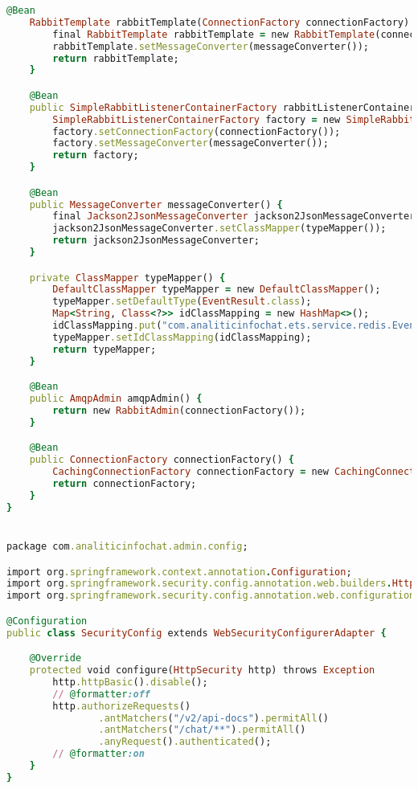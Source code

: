 \begin{lstlisting}[language=Ruby, style=rubystyle]
    @Bean
    RabbitTemplate rabbitTemplate(ConnectionFactory connectionFactory) {
        final RabbitTemplate rabbitTemplate = new RabbitTemplate(connectionFactory);
        rabbitTemplate.setMessageConverter(messageConverter());
        return rabbitTemplate;
    }

    @Bean
    public SimpleRabbitListenerContainerFactory rabbitListenerContainerFactory() {
        SimpleRabbitListenerContainerFactory factory = new SimpleRabbitListenerContainerFactory();
        factory.setConnectionFactory(connectionFactory());
        factory.setMessageConverter(messageConverter());
        return factory;
    }

    @Bean
    public MessageConverter messageConverter() {
        final Jackson2JsonMessageConverter jackson2JsonMessageConverter = new Jackson2JsonMessageConverter();
        jackson2JsonMessageConverter.setClassMapper(typeMapper());
        return jackson2JsonMessageConverter;
    }

    private ClassMapper typeMapper() {
        DefaultClassMapper typeMapper = new DefaultClassMapper();
        typeMapper.setDefaultType(EventResult.class);
        Map<String, Class<?>> idClassMapping = new HashMap<>();
        idClassMapping.put("com.analiticinfochat.ets.service.redis.EventListener$EventResult", EventResult.class);
        typeMapper.setIdClassMapping(idClassMapping);
        return typeMapper;
    }

    @Bean
    public AmqpAdmin amqpAdmin() {
        return new RabbitAdmin(connectionFactory());
    }

    @Bean
    public ConnectionFactory connectionFactory() {
        CachingConnectionFactory connectionFactory = new CachingConnectionFactory("127.0.0.1");
        return connectionFactory;
    }
}


package com.analiticinfochat.admin.config;

import org.springframework.context.annotation.Configuration;
import org.springframework.security.config.annotation.web.builders.HttpSecurity;
import org.springframework.security.config.annotation.web.configuration.WebSecurityConfigurerAdapter;

@Configuration
public class SecurityConfig extends WebSecurityConfigurerAdapter {

    @Override
    protected void configure(HttpSecurity http) throws Exception
        http.httpBasic().disable();
        // @formatter:off
        http.authorizeRequests()
                .antMatchers("/v2/api-docs").permitAll()
                .antMatchers("/chat/**").permitAll()
                .anyRequest().authenticated();
        // @formatter:on
    }
}


\end{lstlisting}
